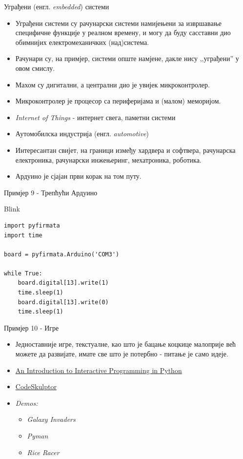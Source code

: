 \documentclass{beamer}
\begin{document}
\begin{frame}{Уграђени (енгл. \textit{embedded}) системи}
\begin{itemize}
    \item Уграђени системи су рачунарски системи намијењени за извршавање специфичне функције у реалном времену, и могу да буду сасставни дио обимнијих електромеханичких (над)система.
    \item Рачунари су, на примјер, системи опште намјене, дакле нису ,,уграђени'' у овом смислу.
    \item Махом су дигитални, а централни дио је увијек микроконтролер.
    \item Микроконтролер је процесор са периферијама и (малом) меморијом.
    \item \textit{Internet of Things} - интернет свега, паметни системи
    \item Аутомобилска индустрија (енгл. \textit{automotive})
    \item Интересантан свијет, на граници између хардвера и софтвера, рачунарска електроника, рачунарски инжењеринг, мехатроника, роботика.
    \item Ардуино је сјајан први корак на том путу.
\end{itemize}
\end{frame}

\begin{frame}[fragile]{Примјер 9 - Трепћући Ардуино}
\begin{block}{Blink}
\begin{lstlisting}
import pyfirmata
import time

board = pyfirmata.Arduino('COM3')

while True:
    board.digital[13].write(1)
    time.sleep(1)
    board.digital[13].write(0)
    time.sleep(1)
\end{lstlisting}
\end{block}
\end{frame}

\begin{frame}{Примјер 10 - Игре}
\begin{itemize}
    \item Једноставније игре, текстуалне, као што је бацање коцкице малоприје већ можете да развијате, имате све што је потербно - питање је само идеје.
    \item \color{violet}\href{https://www.coursera.org/learn/interactive-python-1}{An Introduction to Interactive Programming in Python}
    \item \href{http://www.codeskulptor.org/}{CodeSkulptor}
    \item \textit{Demos:}
    \begin{itemize}
        \item \textit{Galaxy Invaders}
        \item \textit{Pyman}
        \item \textit{Rice Racer}
    \end{itemize}
\end{itemize}
\end{frame}
\end{document}
